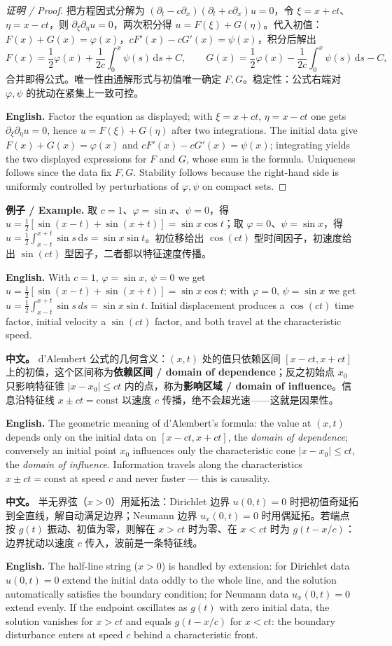 \documentclass[UTF8,11pt,a4paper]{ctexart}
\newcommand{\APS}[2]{\par\noindent\textbf{中文。} #1\par\noindent\textbf{English.} #2\par\smallskip}
\newcommand{\EN}[1]{\par\noindent \textbf{English.} #1\par}
\newcommand{\EX}[2]{\par\noindent \textbf{例子 / Example.} #1\par\EN{#2}}
\newcommand{\dd}{\mathrm{d}}
\begin{document}
\begin{proof}[证明 / Proof]
把方程因式分解为 $(\partial_t-c\partial_x)(\partial_t+c\partial_x)u=0$，令 $\xi=x+ct$、$\eta=x-ct$，则 $\partial_\xi\partial_\eta u=0$，两次积分得 $u=F(\xi)+G(\eta)$。代入初值：$F(x)+G(x)=\varphi(x)$，$cF'(x)-cG'(x)=\psi(x)$，积分后解出
\[
F(x)=\frac12\varphi(x)+\frac{1}{2c}\int_0^x\psi(s)\,\dd s+C,\qquad G(x)=\frac12\varphi(x)-\frac{1}{2c}\int_0^x\psi(s)\,\dd s-C,
\]
合并即得公式。唯一性由通解形式与初值唯一确定 $F,G$。稳定性：公式右端对 $\varphi,\psi$ 的扰动在紧集上一致可控。\EN{Factor the equation as displayed; with $\xi=x+ct$, $\eta=x-ct$ one gets $\partial_\xi\partial_\eta u=0$, hence $u=F(\xi)+G(\eta)$ after two integrations. The initial data give $F(x)+G(x)=\varphi(x)$ and $cF'(x)-cG'(x)=\psi(x)$; integrating yields the two displayed expressions for $F$ and $G$, whose sum is the formula. Uniqueness follows since the data fix $F,G$. Stability follows because the right-hand side is uniformly controlled by perturbations of $\varphi,\psi$ on compact sets.}
\end{proof}

\EX{取 $c=1$、$\varphi=\sin x$、$\psi=0$，得 $u=\frac12[\sin(x-t)+\sin(x+t)]=\sin x\cos t$；取 $\varphi=0$、$\psi=\sin x$，得 $u=\frac12\int_{x-t}^{x+t}\sin s\,\dd s=\sin x\sin t$。初位移给出 $\cos(ct)$ 型时间因子，初速度给出 $\sin(ct)$ 型因子，二者都以特征速度传播。}{With $c=1$, $\varphi=\sin x$, $\psi=0$ we get $u=\frac12[\sin(x-t)+\sin(x+t)]=\sin x\cos t$; with $\varphi=0$, $\psi=\sin x$ we get $u=\frac12\int_{x-t}^{x+t}\sin s\,ds=\sin x\sin t$. Initial displacement produces a $\cos(ct)$ time factor, initial velocity a $\sin(ct)$ factor, and both travel at the characteristic speed.}

\APS{d'Alembert 公式的几何含义：$(x,t)$ 处的值只依赖区间 $[x-ct,x+ct]$ 上的初值，这个区间称为\textbf{依赖区间 / domain of dependence}；反之初始点 $x_0$ 只影响特征锥 $|x-x_0|\le ct$ 内的点，称为\textbf{影响区域 / domain of influence}。信息沿特征线 $x\pm ct=\mathrm{const}$ 以速度 $c$ 传播，绝不会超光速——这就是因果性。}{The geometric meaning of d'Alembert's formula: the value at $(x,t)$ depends only on the initial data on $[x-ct,x+ct]$, the \emph{domain of dependence}; conversely an initial point $x_0$ influences only the characteristic cone $|x-x_0|\le ct$, the \emph{domain of influence}. Information travels along the characteristics $x\pm ct=\mathrm{const}$ at speed $c$ and never faster — this is causality.}

\APS{半无界弦（$x>0$）用延拓法：Dirichlet 边界 $u(0,t)=0$ 时把初值奇延拓到全直线，解自动满足边界；Neumann 边界 $u_x(0,t)=0$ 时用偶延拓。若端点按 $g(t)$ 振动、初值为零，则解在 $x>ct$ 时为零、在 $x<ct$ 时为 $g(t-x/c)$：边界扰动以速度 $c$ 传入，波前是一条特征线。}{The half-line string ($x>0$) is handled by extension: for Dirichlet data $u(0,t)=0$ extend the initial data oddly to the whole line, and the solution automatically satisfies the boundary condition; for Neumann data $u_x(0,t)=0$ extend evenly. If the endpoint oscillates as $g(t)$ with zero initial data, the solution vanishes for $x>ct$ and equals $g(t-x/c)$ for $x<ct$: the boundary disturbance enters at speed $c$ behind a characteristic front.}
\end{document}
